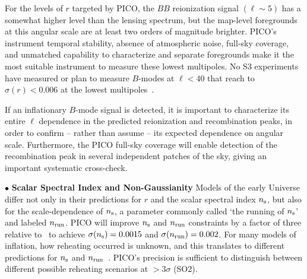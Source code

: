 \documentclass[PICOReport.tex]{subfiles}
\begin{document}
For the levels of $r$ targeted by PICO, the $BB$ reionization signal $(\ell \sim 5)$ has a somewhat higher level than the lensing spectrum, but the map-level foregrounds at this angular scale are at least two orders of magnitude brighter.  PICO's instrument temporal stability, absence of atmospheric noise, full-sky coverage, and unmatched capability to characterize and separate foregrounds make it the most suitable instrument to measure these lowest multipoles. No S3 experiments have measured or plan to measure $B$-modes at $\ell<40$ that reach to $\sigma(r) < 0.006$ at the lowest multipoles~\citep{class,piper}. 

If an inflationary $B$-mode signal is detected, it is important to characterize its entire $\ell$ dependence in the predicted reionization and  recombination peaks, in order to confirm -- rather than assume -- its expected dependence on angular scale.  Furthermore, the PICO full-sky coverage will enable detection of the recombination peak in several independent patches of the sky, giving an important systematic cross-check. 

\noindent$\bullet$ {\bf Scalar Spectral Index and Non-Gaussianity} \hspace{0.1in} Models of the early Universe differ not only in their predictions for $r$ and the scalar spectral index $n_{\rm s}$, but also for the scale-dependence of $n_{\rm s}$, a parameter commonly called `the running of $n_{\rm s}$' and labeled $n_{\rm run}$. PICO will improve $n_{\rm s}$ and $n_{\rm run}$ constraints by a factor of three relative to \planck\ to achieve $\sigma(n_{\rm s})=0.0015$ and $\sigma(n_{\rm run})=0.002$. For many models of inflation, how reheating occurred is unknown, and this translates to different predictions for $n_{\rm s}$ and $n_{\rm run}$~\citep{??}. PICO's precision is sufficient to distinguish between different possible reheating scenarios at $>3\sigma$ (SO2). 
\end{document}
